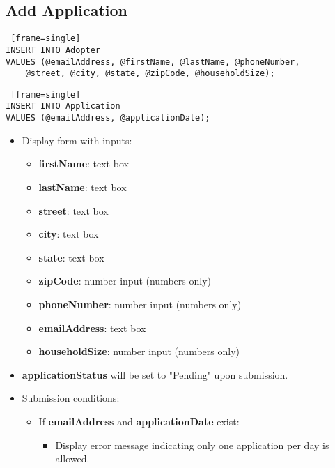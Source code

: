 \documentclass{article}
\begin{document}
\subsection{Add Application}
\begin{Verbatim} [frame=single]
INSERT INTO Adopter
VALUES (@emailAddress, @firstName, @lastName, @phoneNumber, 
    @street, @city, @state, @zipCode, @householdSize);
\end{Verbatim}
\begin{Verbatim} [frame=single]
INSERT INTO Application
VALUES (@emailAddress, @applicationDate);
\end{Verbatim}
\begin{itemize}
    \item Display form with inputs:
    \begin{itemize}
        \item \textbf{firstName}: text box
        \item \textbf{lastName}: text box
        \item \textbf{street}: text box
        \item \textbf{city}: text box
        \item \textbf{state}: text box
        \item \textbf{zipCode}: number input (numbers only)
        \item \textbf{phoneNumber}: number input (numbers only)
        \item \textbf{emailAddress}: text box
        \item \textbf{householdSize}: number input (numbers only)
    \end{itemize}
    \item \textbf{applicationStatus} will be set to "Pending" upon submission.
    \item Submission conditions:
    \begin{itemize}
        \item If \textbf{emailAddress} and \textbf{applicationDate} exist:
        \begin{itemize}
            \item Display error message indicating only one application per day is allowed.
        \end{itemize}
    \end{itemize}
\end{itemize}
\end{document}
